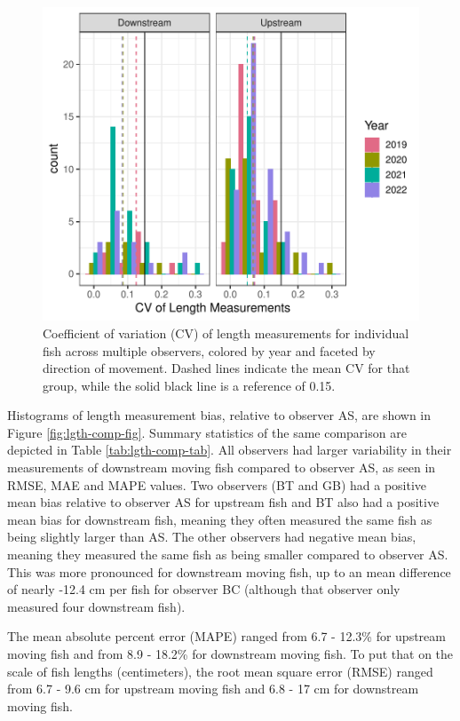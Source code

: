 \documentclass[
]{article}
\begin{document}
\begin{figure}
\centering
\includegraphics{../figures/cv-lgth-hist-1.pdf}
\caption{\label{fig:cv-lgth-hist}Coefficient of variation (CV) of length measurements for individual fish across multiple observers, colored by year and faceted by direction of movement. Dashed lines indicate the mean CV for that group, while the solid black line is a reference of 0.15.}
\end{figure}

Histograms of length measurement bias, relative to observer AS, are shown in Figure \ref{fig:lgth-comp-fig}. Summary statistics of the same comparison are depicted in Table \ref{tab:lgth-comp-tab}. All observers had larger variability in their measurements of downstream moving fish compared to observer AS, as seen in RMSE, MAE and MAPE values. Two observers (BT and GB) had a positive mean bias relative to observer AS for upstream fish and BT also had a positive mean bias for downstream fish, meaning they often measured the same fish as being slightly larger than AS. The other observers had negative mean bias, meaning they measured the same fish as being smaller compared to observer AS. This was more pronounced for downstream moving fish, up to an mean difference of nearly -12.4 cm per fish for observer BC (although that observer only measured four downstream fish).

The mean absolute percent error (MAPE) ranged from 6.7 - 12.3\% for upstream moving fish and from 8.9 - 18.2\% for downstream moving fish. To put that on the scale of fish lengths (centimeters), the root mean square error (RMSE) ranged from 6.7 - 9.6 cm for upstream moving fish and 6.8 - 17 cm for downstream moving fish.
\end{document}
